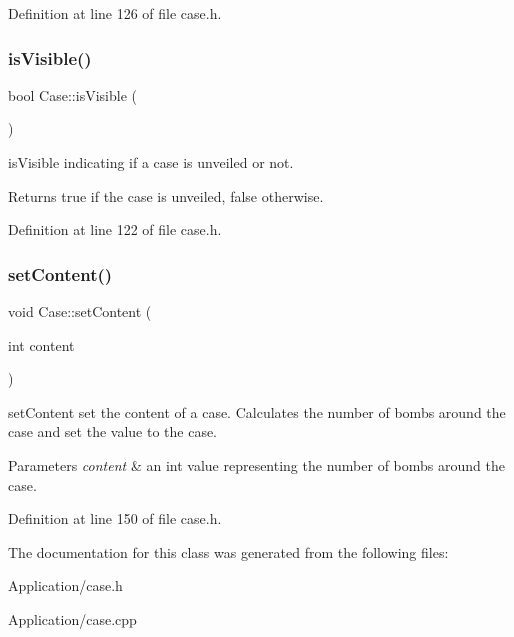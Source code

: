 Definition at line 126 of file case.\+h.

\mbox{\label{class_case_a6bf64c2cc2b5ab1ee9f340dde607eda2}} 
\subsubsection{\texorpdfstring{is\+Visible()}{isVisible()}}
{\footnotesize\ttfamily bool Case\+::is\+Visible (\begin{DoxyParamCaption}{ }\end{DoxyParamCaption})\hspace{0.3cm}{\ttfamily [inline]}}



is\+Visible indicating if a case is unveiled or not. 

\begin{DoxyReturn}{Returns}
true if the case is unveiled, false otherwise. 
\end{DoxyReturn}


Definition at line 122 of file case.\+h.

\mbox{\label{class_case_ab1df4016a7477233809983dccd4b3efc}} 
\subsubsection{\texorpdfstring{set\+Content()}{setContent()}}
{\footnotesize\ttfamily void Case\+::set\+Content (\begin{DoxyParamCaption}\item[{int}]{content }\end{DoxyParamCaption})\hspace{0.3cm}{\ttfamily [inline]}}



set\+Content set the content of a case. Calculates the number of bombs around the case and set the value to the case. 


\begin{DoxyParams}{Parameters}
{\em content} & an int value representing the number of bombs around the case. \\
\hline
\end{DoxyParams}


Definition at line 150 of file case.\+h.



The documentation for this class was generated from the following files\+:\begin{DoxyCompactItemize}
\item 
Application/case.\+h\item 
Application/case.\+cpp\end{DoxyCompactItemize}
